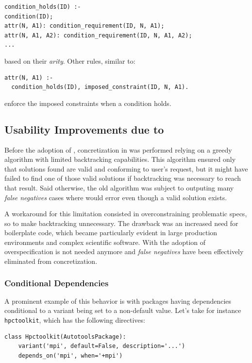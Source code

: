 \begin{verbatim}
condition_holds(ID) :-
condition(ID);
attr(N, A1): condition_requirement(ID, N, A1);
attr(N, A1, A2): condition_requirement(ID, N, A1, A2);
...
\end{verbatim}

based on their \emph{arity}. Other rules, similar to:

\begin{verbatim}
attr(N, A1) :-
  condition_holds(ID), imposed_constraint(ID, N, A1).
\end{verbatim}

enforce the imposed constraints when a condition holds.

\subsection{Usability Improvements due to \clingo}
Before the adoption of \clingo, concretization in \spack{} was performed relying on a greedy algorithm with limited backtracking capabilities. This algorithm ensured only that solutions found are valid and conforming to user's request, but it might have failed to find one of those valid solutions if backtracking was necessary to reach that result. Said otherwise, the old algorithm was subject to outputing many \emph{false negatives} \textemdash{} cases where \spack{} would error even though a valid solution exists.

A workaround for this limitation consisted in overconstraining problematic specs, so to make backtracking unnecessary. The drawback was an increased need for boilerplate code, which became particularly evident in large production environments and complex scientific software. With the adoption of \clingo{} overspecification is not needed anymore and \emph{false negatives} have been effectively eliminated from concretization.

\subsubsection{Conditional Dependencies}
A prominent example of this behavior is with packages having dependencies conditional to a variant being set to a non-default value. Let's take for instance \texttt{hpctoolkit}, which has the following directives:

\begin{verbatim}
class Hpctoolkit(AutotoolsPackage):
    variant('mpi', default=False, description='...')
    depends_on('mpi', when='+mpi')
\end{verbatim}

